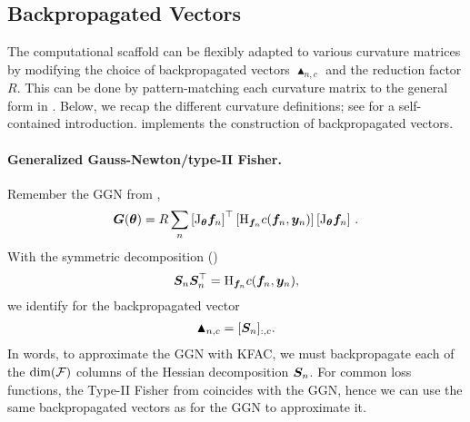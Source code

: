 \subsection{Backpropagated Vectors}\label{subsec:backpropagated-vectors}
The computational scaffold can be flexibly adapted to various curvature matrices by modifying the choice of backpropagated vectors $\blacktriangle_{n,c}$ and the reduction factor $R$.
This can be done by pattern-matching each curvature matrix to the general form in .
Below, we recap the different curvature definitions; see  for a self-contained introduction.
 implements the construction of backpropagated vectors.

\paragraph{Generalized Gauss-Newton/type-II Fisher.} Remember the GGN from ,
\begin{align*}
  {\bm{G}}({\bm{\theta}})= R \sum_n
  \left[\mathrm{J}_{{\bm{\theta}}} {\bm{f}}_n\right]^{\top}
  \left[\mathrm{H}_{{\bm{f}}_n} c({\bm{f}}_n, {\bm{y}}_n)
  \right]
  \left[\mathrm{J}_{{\bm{\theta}}} {\bm{f}}_n\right]\,.
\end{align*}
With the symmetric decomposition ()
$${\bm{S}}_n {\bm{S}}_n^{\top} = \mathrm{H}_{{\bm{f}}_n} c({\bm{f}}_n, {\bm{y}}_n),$$ we identify for the backpropagated vector
\begin{align*}
  \blacktriangle_{n,c} = [{\bm{S}}_n]_{:,c}.
\end{align*}
In words, to approximate the GGN with KFAC, we must backpropagate each of the $\dim({\mathcal{F}})$ columns of the Hessian decomposition ${\bm{S}}_n$.
For common loss functions, the Type-II Fisher from  coincides with the GGN, hence we can use the same backpropagated vectors as for the GGN to approximate it.

